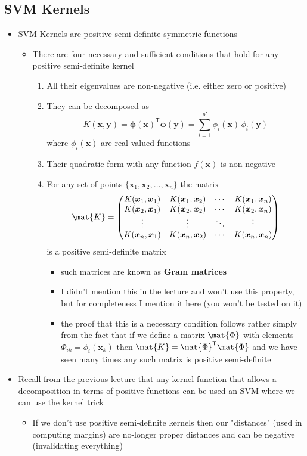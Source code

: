 \documentclass[11pt]{article}
\newcommand{\tr}{\textsf{T}}
\begin{document}
\subsection{SVM Kernels}
\label{sec:orgfab9c8a}
\begin{itemize}
\item SVM Kernels are positive semi-definite symmetric functions
\begin{itemize}
\item There are four necessary and sufficient conditions that hold
for any positive semi-definite kernel
\begin{enumerate}
\item All their eigenvalues are non-negative (i.e. either zero or positive)
\item They can be decomposed as
$$  K(\bm{x},\bm{y}) = \bm{\phi}(\bm{x})^\tr\bm{\phi}(\bm{y}) =
          \sum_{i=1}^{p'} \phi_i(\bm{x})\,\phi_i(\bm{y})$$
where \(\phi_i(\bm{x})\) are real-valued functions
\item Their quadratic form with any function \(f(\bm{x})\) is non-negative
\item For any set of points \(\{\bm{x}_1, \bm{x}_2, \ldots,
          \bm{x}_n\}\) the matrix
$$ \mat{K} = \begin{pmatrix} K(\bm{x}_1, \bm{x}_1) &
          K(\bm{x}_1, \bm{x}_2) &\cdots &  K(\bm{x}_1, \bm{x}_n) \\
          K(\bm{x}_2, \bm{x}_1) &
          K(\bm{x}_2, \bm{x}_2) &\cdots &  K(\bm{x}_2, \bm{x}_n) \\
	  \vdots & \vdots & \ddots & \vdots \\
          K(\bm{x}_n, \bm{x}_1) &
          K(\bm{x}_n, \bm{x}_2) &\cdots &  K(\bm{x}_n, \bm{x}_n) 
	  \end{pmatrix} $$
is a positive semi-definite matrix
\begin{itemize}
\item such matrices are known as \textbf{Gram matrices}
\item I didn't mention this in the lecture and won't use this
property, but for completeness I mention it here (you
won't be tested on it)
\item the proof that this is a necessary condition follows
rather simply from the fact that if we define a matrix
\(\mat{\Phi}\) with elements \(\Phi_{ik} = \phi_i(\bm{x}_k)\)
then \(\mat{K} = \mat{\Phi}^\tr \mat{\Phi}\) and we have
seen many times any such matrix is positive semi-definite
\end{itemize}
\end{enumerate}
\end{itemize}
\item Recall from the previous lecture that any kernel function that
allows a decomposition in terms of positive functions can be used
an SVM where we can use the kernel trick
\begin{itemize}
\item If we don't use positive semi-definite kernels then our
"distances" (used in computing margins) are no-longer proper
distances and can be negative (invalidating everything)
\end{itemize}
\end{itemize}
\end{document}
